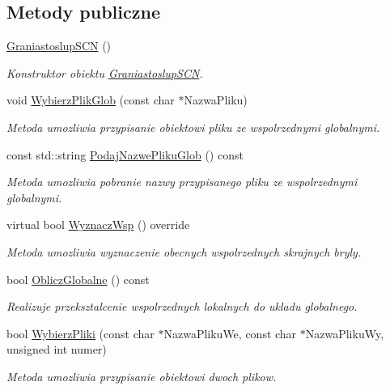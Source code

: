 \subsection*{Metody publiczne}
\begin{DoxyCompactItemize}
\item 
\hyperlink{classGraniastoslupSCN_a1cf442360ec14fc7fa22af9ddefd1d35}{Graniastoslup\+S\+CN} ()
\begin{DoxyCompactList}\small\item\em Konstruktor obiektu \hyperlink{classGraniastoslupSCN}{Graniastoslup\+S\+CN}. \end{DoxyCompactList}\item 
void \hyperlink{classGraniastoslupSCN_a6c761ec9040c78b88e8f927bbe1fefb2}{Wybierz\+Plik\+Glob} (const char $\ast$Nazwa\+Pliku)
\begin{DoxyCompactList}\small\item\em Metoda umozliwia przypisanie obiektowi pliku ze wspolrzednymi globalnymi. \end{DoxyCompactList}\item 
const std\+::string \hyperlink{classGraniastoslupSCN_ad3d658eb048fd25af6a31a6416e02908}{Podaj\+Nazwe\+Pliku\+Glob} () const
\begin{DoxyCompactList}\small\item\em Metoda umozliwia pobranie nazwy przypisanego pliku ze wspolrzednymi globalnymi. \end{DoxyCompactList}\item 
virtual bool \hyperlink{classGraniastoslupSCN_a096492db05264adae9306f5fb50cc3c9}{Wyznacz\+Wsp} () override
\begin{DoxyCompactList}\small\item\em Metoda umozliwia wyznaczenie obecnych wspolrzednych skrajnych bryly. \end{DoxyCompactList}\item 
bool \hyperlink{classGraniastoslupSCN_a4bf899d8eba989560c5955748c2c5204}{Oblicz\+Globalne} () const
\begin{DoxyCompactList}\small\item\em Realizuje przeksztalcenie wspolrzednych lokalnych do ukladu globalnego. \end{DoxyCompactList}\item 
bool \hyperlink{classGraniastoslupSCN_a279b52ec2cb4c39f1025089695388a2a}{Wybierz\+Pliki} (const char $\ast$Nazwa\+Pliku\+We, const char $\ast$Nazwa\+Pliku\+Wy, unsigned int numer)
\begin{DoxyCompactList}\small\item\em Metoda umozliwia przypisanie obiektowi dwoch plikow. \end{DoxyCompactList}\item 

\end{DoxyCompactItemize}
